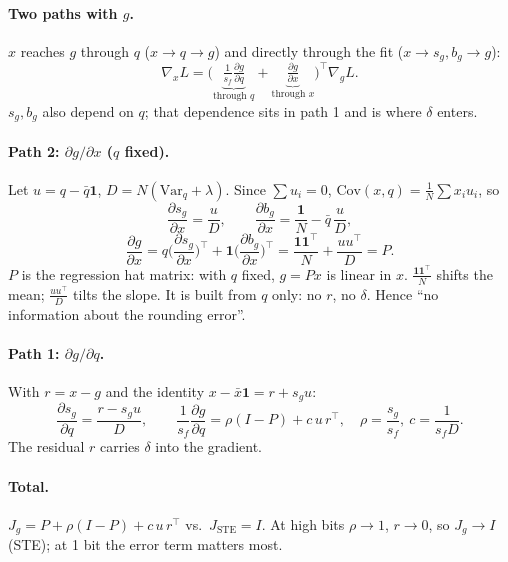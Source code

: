 \documentclass[11pt]{article}
\begin{document}
\paragraph{Two paths with $g$.} $x$ reaches $g$ through $q$ ($x\to q\to g$) and directly through the fit ($x\to s_g,b_g\to g$):
\[
\nabla_xL=\Big(\underbrace{\tfrac1{s_f}\tfrac{\partial g}{\partial q}}_{\text{through }q}+\underbrace{\tfrac{\partial g}{\partial x}}_{\text{through }x}\Big)^{\!\top}\nabla_gL.
\]
$s_g,b_g$ also depend on $q$; that dependence sits in path 1 and is where $\delta$ enters.

\paragraph{Path 2: $\partial g/\partial x$ ($q$ fixed).} Let $u=q-\bar q\mathbf 1$, $D=N(\mathrm{Var}_q+\lambda)$. Since $\sum u_i=0$, $\mathrm{Cov}(x,q)=\frac1N\sum x_iu_i$, so
\[
\frac{\partial s_g}{\partial x}=\frac uD,\qquad \frac{\partial b_g}{\partial x}=\frac{\mathbf 1}N-\bar q\,\frac uD,
\]
\[
\frac{\partial g}{\partial x}=q\Big(\frac{\partial s_g}{\partial x}\Big)^{\!\top}+\mathbf 1\Big(\frac{\partial b_g}{\partial x}\Big)^{\!\top}=\frac{\mathbf 1\mathbf 1^\top}N+\frac{uu^\top}{D}=P.
\]
$P$ is the regression hat matrix: with $q$ fixed, $g=Px$ is linear in $x$. $\frac{\mathbf 1\mathbf 1^\top}N$ shifts the mean; $\frac{uu^\top}D$ tilts the slope. It is built from $q$ only: no $r$, no $\delta$. Hence ``no information about the rounding error''.

\paragraph{Path 1: $\partial g/\partial q$.} With $r=x-g$ and the identity $x-\bar x\mathbf 1=r+s_gu$:
\[
\frac{\partial s_g}{\partial q}=\frac{r-s_gu}{D},\qquad \frac1{s_f}\frac{\partial g}{\partial q}=\rho(I-P)+c\,u\,r^\top,\quad \rho=\frac{s_g}{s_f},\ c=\frac1{s_fD}.
\]
The residual $r$ carries $\delta$ into the gradient.

\paragraph{Total.} $J_g=P+\rho(I-P)+c\,u\,r^\top$ vs.\ $J_{\text{STE}}=I$. At high bits $\rho\to1$, $r\to0$, so $J_g\to I$ (STE); at 1 bit the error term matters most.
\end{document}
